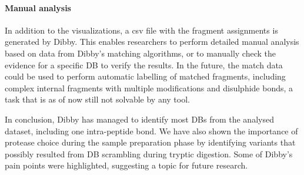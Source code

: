 \paragraph{Manual analysis} In addition to the visualizations, a csv file with the fragment assignments is generated by Dibby. This enables researchers to perform detailed manual analysis based on data from Dibby's matching algorithms, or to manually check the evidence for a specific DB to verify the results. In the future, the match data could be used to perform automatic labelling of matched fragments, including complex internal fragments with multiple modifications and disulphide bonds, a task that is as of now still not solvable by any tool.

In conclusion, Dibby has managed to identify most DBs from the analysed dataset, including one intra-peptide bond. We have also shown the importance of protease choice during the sample preparation phase by identifying variants that possibly resulted from DB scrambling during tryptic digestion. Some of Dibby's pain points were highlighted, suggesting a topic for future research.
